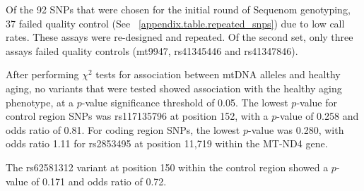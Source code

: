 Of the 92 SNPs that were chosen for the initial round of Sequenom genotyping, 37 failed quality control (See ~\ref{appendix.table.repeated_snps}) due to low call rates.  These assays were re-designed and repeated.  Of the second set, only three assays failed quality controls (mt9947, rs41345446 and rs41347846).

After performing $\chi^{2}$ tests for association between mtDNA alleles and healthy aging, no variants that were tested showed association with the healthy aging phenotype, at a $p$-value significance threshold of 0.05.  The lowest $p$-value for control region SNPs was rs117135796 at position 152, with a $p$-value of 0.258 and odds ratio of 0.81.  For coding region SNPs, the lowest $p$-value was 0.280, with odds ratio 1.11 for rs2853495 at position 11,719 within the MT-ND4 gene.

The rs62581312 variant at position 150 within the control region showed a $p$-value of 0.171 and odds ratio of 0.72.

\begin{table}[!htb]
\begin{minipage}{\textwidth}
\caption{Mitochondrial Control Region (MAF $>$ 0.10)}
\label{assoc.tab.cr}
\noindent{}
\end{minipage}
\end{table}

